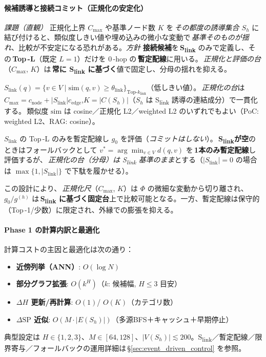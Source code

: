 \documentclass[ja=standard,xelatex]{bxjsarticle}
\begin{document}
\paragraph{候補誘導と接続コミット（正規化の安定化）}
\textit{課題（直観）}\; 正規化上界 $C_{\max}$ や基準ノード数 $K$ を\,\emph{その都度の誘導集合 $S_h$} に結び付けると、類似度しきい値や埋め込みの微小な変動で\,\emph{基準そのものが揺れ}、比較が不安定になる恐れがある。\;\textit{方針}\; \textbf{接続候補}を\,\textbf{S\textsubscript{link}} のみで定義し、その\,\textbf{Top\,\mbox{-}L}（既定 $L{=}1$）だけを 0\,\mbox{-}hop の\,\textbf{暫定配線}に用いる。\,\emph{正規化と評価の台}（$C_{\max}$, $K$）は\,\textbf{常に S\textsubscript{link} に基づく}値で固定し、分母の揺れを抑える。

\begin{description}[leftmargin=1.8em,labelwidth=5.2em]
  \item[接続候補] $\displaystyle S_{\mathrm{link}}(q)=\big\{v\in V\;\big|\;\mathrm{sim}(q,v)\ge\theta_{\mathrm{link}}\big\}_{\mathrm{Top}\text{-}k_{\mathrm{link}}}$（低しきい値）。\,\emph{正規化の台}は $C_{\max}{=}c_{\mathrm{node}}{+}|S_{\mathrm{link}}|c_{\mathrm{edge}}$,\;$K{=}|C(S_h)|$（$S_h$ は S\textsubscript{link} 誘導の連結成分）で一貫化する。\,類似度 $\mathrm{sim}$ は cosine／正規化 L2／weighted L2 のいずれでもよい（PoC: weighted L2、RAG: cosine）。
  \item[0-hop評価] $S_{\mathrm{link}}$ の Top\,\mbox{-}L のみを暫定配線し $g_0$ を評価（\emph{コミットはしない}）。\,\textbf{S\textsubscript{link}が空}のときはフォールバックとして $v^*{=}\arg\min_{v\in V} d(q,v)$ を\,\textbf{1本のみ暫定配線}し評価するが、\,\emph{正規化の台（分母）は S\textsubscript{link} 基準のまま}とする（$|S_{\mathrm{link}}|{=}0$ の場合は $\max\{1,|S_{\mathrm{link}}|\}$ で下駄を履かせる）。
\end{description}

この設計により、\,\emph{正規化尺}（$C_{\max}$, $K$）は $\Phi$ の微細な変動から切り離され、$g_0/g^{(h)}$ は\,\textbf{S\textsubscript{link} に基づく固定台}上で比較可能となる。一方、暫定配線は保守的（Top\,\mbox{-}1/少数）に限定され、外縁での膨張を抑える。

\paragraph{Phase 1 の計算内訳と最適化}
計算コストの主因と最適化は次の通り：
\begin{itemize}[leftmargin=*]
  \item \textbf{近傍列挙（ANN）}: $O(\log N)$
  \item \textbf{部分グラフ拡張}: $O(k^H)$（$k$: 候補幅, $H\le3$ 目安）
  \item \textbf{$\Delta H$ 更新/再計算}: $O(1)$/ $O(K)$（カテゴリ数）
  \item \textbf{$\Delta\mathrm{SP}$ 近似}: $O(M\cdot |E(S_h)|)$（多源BFS＋キャッシュ＋早期停止）
\end{itemize}
典型設定は $H\in\{1,2,3\}$、$M\in[64,128]$、$|V(S_h)|\lesssim200$。S\textsubscript{link}／暫定配線／限界寄与／フォールバックの運用詳細は\,\S\ref{sec:event_driven_control} を参照。
\end{document}
